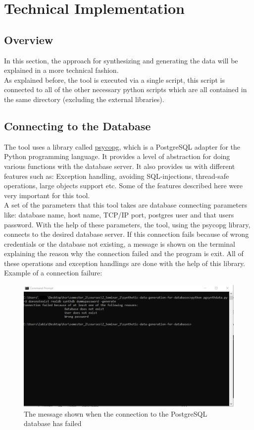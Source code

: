 \chapter{Technical Implementation}
\label{ch:technical_implementation}
\section{Overview}
In this section, the approach for synthesizing and generating the data will be explained in a more technical fashion.\\
As explained before, the tool is executed via a single script, this script is connected to all of the other necessary python scripts which are all contained in the same directory (excluding the external libraries).
\section{Connecting to the Database}
The tool uses a library called \href{https://www.psycopg.org/}{psycopg}, which is a PostgreSQL adapter for the Python programming language. It provides a level of abstraction for doing various functions with the database server. It also provides us with different features such as: Exception handling, avoiding SQL-injections, thread-safe operations, large objects support etc. Some of the features described here were very important for this tool.\\
\newline
A set of the parameters that this tool takes are database connecting parameters like: database name, host name, TCP/IP port, postgres user and that users password. With the help of these parameters, the tool, using the psycopg library, connects to the desired database server. If this connection fails because of wrong credentials or the database not existing, a message is shown on the terminal explaining the reason why the connection failed and the program is exit. All of these operations and exception handlings are done with the help of this library.\\
\newpage
Example of a connection failure:
\begin{figure}[H]
	\includegraphics[width=\linewidth]{./Figures/ToolEvaluation/connection_failure_message.png}
	\caption{The message shown when the connection to the PostgreSQL database has failed}
\end{figure}
